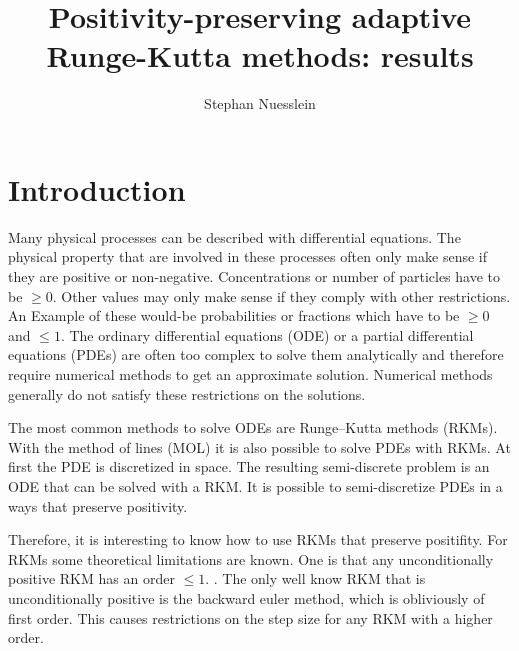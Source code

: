 \documentclass{article}
\title{Positivity-preserving adaptive Runge-Kutta methods: results}
\author{Stephan Nuesslein}
\begin{document}
\maketitle

\section{Introduction}


Many physical processes can be described with differential equations. 
The physical property that are involved in these processes often only make sense if they are positive or non-negative. 
Concentrations or number of particles have to be $\geq 0$.
Other values may only make sense if they comply with other restrictions. An Example of these would-be probabilities or fractions which have to be $\geq 0$ and $\leq 1$.
The ordinary differential equations (ODE) or a partial differential equations (PDEs) are often too complex to solve them analytically and therefore require numerical methods to get an approximate solution.
Numerical methods generally do not satisfy these restrictions on the solutions.

The most common methods to solve ODEs are Runge–Kutta methods (RKMs). 
With the method of lines (MOL) it is also possible to solve PDEs with RKMs.
At first the PDE is discretized in space. The resulting semi-discrete problem is an ODE that can be solved with a RKM. 
It is possible to semi-discretize PDEs in a ways that preserve positivity\cite{kopecz_comparison_2019,kopecz_unconditionally_2018}.

Therefore, it is interesting to know how to use RKMs that preserve positifity.
For RKMs some theoretical limitations are known. One is that any unconditionally positive RKM has an order $\leq 1$. \cite{hundsdorfer_numerical_2003,bolley_conservation_1978,horvath_positivity_1998}. The only well know RKM that is unconditionally positive is the backward euler method, which is obliviously of first order. 
This causes restrictions on the step size for any RKM with a higher order.
\end{document}
